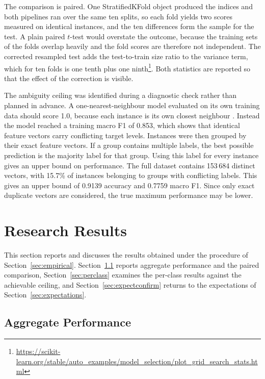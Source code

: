 \documentclass[conference]{IEEEtran}
\begin{document}
The comparison is paired. One StratifiedKFold object produced the indices and
both pipelines ran over the same ten splits, so each fold yields two scores
measured on identical instances, and the ten differences form the sample for the
test. A plain paired $t$-test would overstate the outcome, because the training
sets of the folds overlap heavily and the fold scores are therefore not
independent. The corrected resampled test adds the test-to-train size ratio to
the variance term, which for ten folds is one tenth plus one
ninth\footnote{\url{https://scikit-learn.org/stable/auto_examples/model_selection/plot_grid_search_stats.html}}.
Both statistics are reported so that the effect of the correction is visible.

The ambiguity ceiling was identified during a diagnostic check rather than 
planned in advance. A one-nearest-neighbour model evaluated on its own training data should score
1.0, because each instance is its own closest neighbour \cite{kelleher2015}.
Instead the model reached a training macro F1 of 0.853, which shows that
identical feature vectors carry conflicting target levels. Instances were then 
grouped by their exact feature vectors. If a group contains multiple labels, the 
best possible prediction is the majority label for that group. Using this label 
for every instance gives an upper bound on performance. The full dataset contains 
153\,684 distinct vectors, with 15.7\% of instances belonging to groups with 
conflicting labels. This gives an upper bound of 0.9139 accuracy and 0.7759 macro 
F1. Since only exact duplicate vectors are considered, the true maximum performance
may be lower.

\section{Research Results}
\label{sec:results}
This section reports and discusses the results obtained under the procedure of
Section~\ref{sec:empirical}. Section~\ref{sec:aggregate} reports aggregate
performance and the paired comparison, Section~\ref{sec:perclass} examines the
per-class results against the achievable ceiling, and
Section~\ref{sec:expectconfirm} returns to the expectations of
Section~\ref{sec:expectations}.

\subsection{Aggregate Performance}
\label{sec:aggregate}
\end{document}

